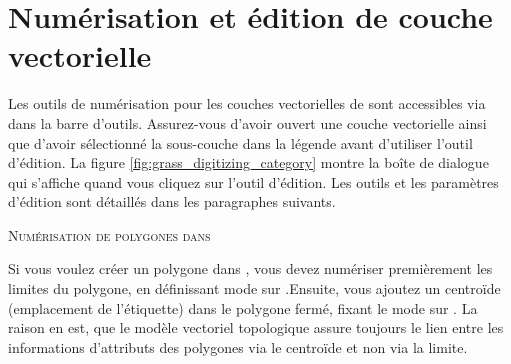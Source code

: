 {%
\section{Numérisation et édition de couche vectorielle \grass}\label{grass_digitising}

Les outils de numérisation pour les couches vectorielles de \grass sont accessibles via\\  dans la barre d'outils. Assurez-vous d'avoir ouvert une couche vectorielle \grass ainsi que d'avoir sélectionné la sous-couche dans la légende avant d'utiliser l'outil d'édition. La figure \ref{fig:grass_digitizing_category} montre la boîte de dialogue \grass qui s'affiche quand vous cliquez sur l'outil d'édition. Les outils et les paramètres d'édition sont détaillés dans les paragraphes suivants.

\begin{Tip}\caption{\textsc{Numérisation de polygones dans \grass}}
Si vous voulez créer un polygone dans \grass, vous devez numériser premièrement les limites du polygone, en définissant mode sur .Ensuite, vous ajoutez un centroïde (emplacement de l'étiquette) dans le polygone fermé, fixant le mode sur . La raison en est, que le modèle vectoriel topologique assure toujours le lien entre les informations d'attributs des polygones via le centroïde et non via la limite.
\end{Tip}

}
